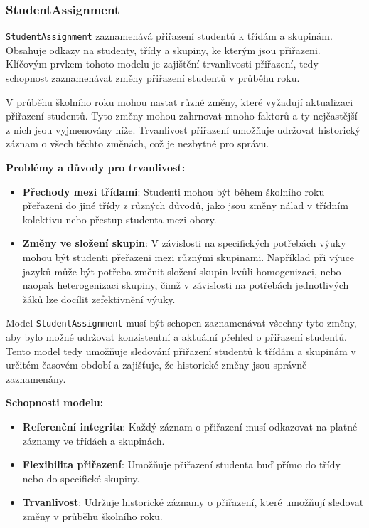 \subsubsection*{StudentAssignment}

\texttt{StudentAssignment} zaznamenává přiřazení studentů k třídám a skupinám. Obsahuje odkazy na studenty, třídy a skupiny, ke kterým jsou přiřazeni. Klíčovým prvkem tohoto modelu je zajištění trvanlivosti přiřazení, tedy schopnost zaznamenávat změny přiřazení studentů v průběhu roku. 

V průběhu školního roku mohou nastat různé změny, které vyžadují aktualizaci přiřazení studentů. Tyto změny mohou zahrnovat mnoho faktorů a ty nejčastější z nich jsou vyjmenovány níže. Trvanlivost přiřazení umožňuje udržovat historický záznam o všech těchto změnách, což je nezbytné pro správu.

\textbf{Problémy a důvody pro trvanlivost:}

\begin{itemize}
    \item \textbf{Přechody mezi třídami}: Studenti mohou být během školního roku přeřazeni do jiné třídy z různých důvodů, jako jsou změny nálad v třídním kolektivu nebo přestup studenta mezi obory.
    \item \textbf{Změny ve složení skupin}: V závislosti na specifických potřebách výuky mohou být studenti přeřazeni mezi různými skupinami. Například při výuce jazyků může být potřeba změnit složení skupin kvůli homogenizaci, nebo naopak heterogenizaci skupiny, čimž v závislosti na potřebách jednotlivých žáků lze docílit zefektivnění výuky.
\end{itemize}

Model \texttt{StudentAssignment} musí být schopen zaznamenávat všechny tyto změny, aby bylo možné udržovat konzistentní a aktuální přehled o přiřazení studentů. Tento model tedy umožňuje sledování přiřazení studentů k třídám a skupinám v určitém časovém období a zajišťuje, že historické změny jsou správně zaznamenány.

\textbf{Schopnosti modelu:}

\begin{itemize}
    \item \textbf{Referenční integrita}: Každý záznam o přiřazení musí odkazovat na platné záznamy ve třídách a skupinách.
    \item \textbf{Flexibilita přiřazení}: Umožňuje přiřazení studenta buď přímo do třídy nebo do specifické skupiny.
    \item \textbf{Trvanlivost}: Udržuje historické záznamy o přiřazení, které umožňují sledovat změny v průběhu školního roku.
\end{itemize}

